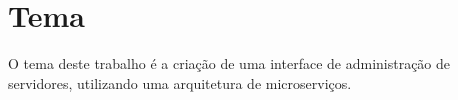 \section{Tema}

  O tema deste trabalho é a criação de uma interface de administração
  de servidores, utilizando uma arquitetura de microserviços.

  
